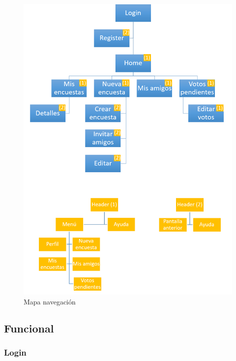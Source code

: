 \documentclass[a4paper, 12pt]{book}
\begin{document}
\begin{figure}[H]
  \centering
  \includegraphics[width=15cm, keepaspectratio]{img/mapa_navegacion.png}
  \caption{Mapa navegaci\'on}
  \label{figura:mapa_navegacion}
\end{figure}


\subsection{Funcional}
\label{sec:funcional}

\subsubsection{Login}
\label{sec:login}
\end{document}

